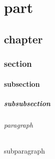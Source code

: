 \part{part}
\chapter{chapter}
\section{section}
\subsection{subsection}
\subsubsection{subsubsection}
\paragraph{paragraph}
\subparagraph{subparagraph} 

